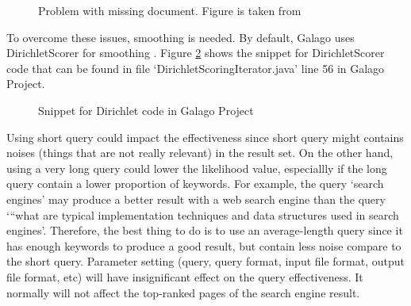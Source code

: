 \documentclass[letterpaper,11pt]{article}
\begin{document}
\begin{figure}[H]
	\centering
	\caption{Problem with missing document. Figure is taken from \cite{language-model}}
	\label{fig:7_8_zero_problem}
\end{figure}

To overcome these issues, smoothing is needed. By default, Galago uses DirichletScorer for smoothing \cite{galago-default-smoothing}. Figure \ref{fig:7_8_dirichlet} shows the snippet for DirichletScorer code that can be found in file `DirichletScoringIterator.java' line 56 in Galago Project. 

\begin{figure}[H]
	\centering
	\caption{Snippet for Dirichlet code in Galago Project}
	\label{fig:7_8_dirichlet}
\end{figure}

Using short query could impact the effectiveness since short query might contains noises (things that are not really relevant) in the result set. On the other hand, using a very long query could lower the likelihood value, especiallly if the long query contain a lower proportion of keywords. For example, the query `search engines' may produce a better result with a web search engine than the query `“what are typical implementation techniques and data structures used in search engines'. Therefore, the best thing to do is to use an average-length query since it has enough keywords to produce a good result, but contain less noise compare to the short query. \newline
Parameter setting (query, query format, input file format, output file format, etc) will have insignificant effect on the query effectiveness. It normally will not affect the top-ranked pages of the search engine result. 
\end{document}
